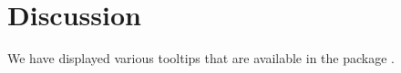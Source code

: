 \hypertarget{discussion}{%
\section{Discussion}\label{discussion}}

We have displayed various tooltips that are available in the package
.



\address{%
Amit Chinwan\\
Maynooth University\\%
Hamilton Institute\\ Maynooth, Ireland\\
%
%
%
\href{mailto:amit.chinwan.2019@mumail.ie}{\nolinkurl{amit.chinwan.2019@mumail.ie}}%
}

\address{%
Catherine Hurley\\
Maynooth University\\%
Department of Mathematics and Statistics\\ Maynooth, Ireland\\
%
%
%
\href{mailto:catherine.hurley@mu.ie}{\nolinkurl{catherine.hurley@mu.ie}}%
}
